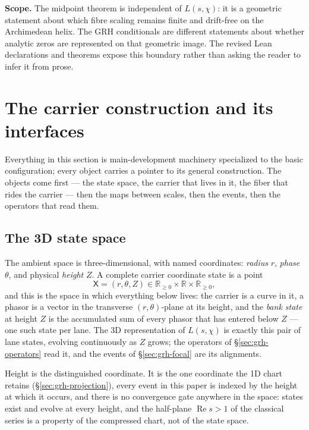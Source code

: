 \documentclass[11pt]{article}
\theoremstyle{definition}
\renewcommand{\Re}{\operatorname{Re}}
\begin{document}
\medskip
\noindent\textbf{Scope.}  The midpoint theorem is independent of
\(L(s,\chi)\): it is a geometric statement about which fibre scaling remains
finite and drift-free on the Archimedean helix.  The GRH conditionals are
different statements about whether analytic zeros are represented on that
geometric image.  The revised Lean declarations and theorems expose this
boundary rather than asking the reader to infer it from prose.

\section{The carrier construction and its interfaces}\label{sec:grh-construction}

Everything in this section is main-development machinery \cite{UniversalCarrier} specialized to the basic
configuration; every object carries a pointer to its general construction.
The objects come first --- the state space, the carrier that lives in it, the
fiber that rides the carrier --- then the maps between scales, then the
events, then the operators that read them.

\subsection{The 3D state space}\label{sec:grh-statespace}

The ambient space is three-dimensional, with named coordinates: \emph{radius}
\(r\), \emph{phase} \(\theta\), and physical \emph{height} \(Z\). A complete carrier
coordinate state is a point
\[
\mathsf X=(r,\theta,Z)\in\mathbb R_{\ge0}\times\mathbb R\times\mathbb R_{\ge0},
\]
and this is the space in which everything below lives: the carrier is a curve
in it, a phasor is a vector in the transverse \((r,\theta)\)-plane at its
height, and the \emph{bank state} at height \(Z\) is the accumulated sum of
every phasor that has entered below \(Z\) --- one such state per lane. The 3D
representation of \(L(s,\chi)\) is exactly this pair of lane states, evolving
continuously as \(Z\) grows; the operators of \S\ref{sec:grh-operators} read
it, and the events of \S\ref{sec:grh-focal} are its alignments.

Height is the distinguished coordinate. It is the one coordinate the 1D chart
retains (\S\ref{sec:grh-projection}), every event in this paper is indexed by
the height at which it occurs, and there is no convergence gate anywhere in
the space: states exist and evolve at every height, and the half-plane
\(\Re s>1\) of the classical series is a property of the compressed chart,
not of the state space.
\end{document}
